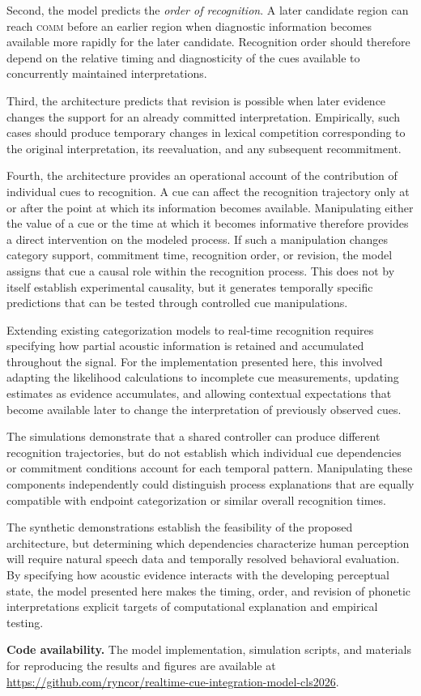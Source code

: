 \documentclass[12pt]{article}
\begin{document}
Second, the model predicts the \textit{order of recognition}.
%
A later candidate region can reach \textsc{comm} before an earlier region when diagnostic information becomes available more rapidly for the later candidate.
%
Recognition order should therefore depend on the relative timing and diagnosticity of the cues available to concurrently maintained interpretations.

Third, the architecture predicts that revision is possible when later evidence changes the support for an already committed interpretation.
%
Empirically, such cases should produce temporary changes in lexical competition corresponding to the original interpretation, its reevaluation, and any subsequent recommitment.

Fourth, the architecture provides an operational account of the contribution of individual cues to recognition.
%
A cue can affect the recognition trajectory only at or after the point at which its information becomes available.
%
Manipulating either the value of a cue or the time at which it becomes informative therefore provides a direct intervention on the modeled process.
%
If such a manipulation changes category support, commitment time, recognition order, or revision, the model assigns that cue a causal role within the recognition process.
%
This does not by itself establish experimental causality, but it generates temporally specific predictions that can be tested through controlled cue manipulations.

Extending existing categorization models to real-time recognition requires specifying how partial acoustic information is retained and accumulated throughout the signal.
%
For the implementation presented here, this involved adapting the likelihood calculations to incomplete cue measurements, updating estimates as evidence accumulates, and allowing contextual expectations that become available later to change the interpretation of previously observed cues.

The simulations demonstrate that a shared controller can produce different recognition trajectories, but do not establish which individual cue dependencies or commitment conditions account for each temporal pattern.
%
Manipulating these components independently could distinguish process explanations that are equally compatible with endpoint categorization or similar overall recognition times.

The synthetic demonstrations establish the feasibility of the proposed architecture, but determining which dependencies characterize human perception will require natural speech data and temporally resolved behavioral evaluation.
%
By specifying how acoustic evidence interacts with the developing perceptual state, the model presented here makes the timing, order, and revision of phonetic interpretations explicit targets of computational explanation and empirical testing.

\par\medskip
\noindent\textbf{Code availability.}
%
The model implementation, simulation scripts, and materials for reproducing the results and figures are available at \url{https://github.com/ryncor/realtime-cue-integration-model-cls2026}.



\end{document}
